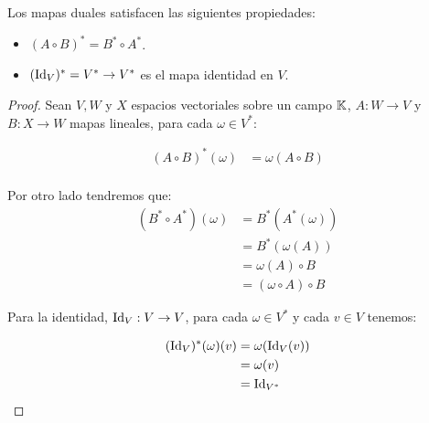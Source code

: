 \begin{lemma}
Los mapas duales satisfacen las siguientes propiedades:
  \begin{itemize}
    \item $(A \circ B)^{*} = B^{*} \circ A^{*}$.
    \item $(\mathrm{Id}_V)^{*} = V^{*} \to V^{*}$ es el mapa identidad en $V$.
  \end{itemize}
\end{lemma}

\begin{proof}
  Sean $V,W$ y $X$ espacios vectoriales sobre un campo $\mathbb{K}$, $A: W \to V$ y $B: X \to W$ mapas lineales, para cada $\omega \in V^{*}$:
  
\begin{align*}
  (A\circ B)^{*}(\omega) &= \omega(A \circ B)\\
\end{align*}

Por otro lado tendremos que:
  \begin{align*}
    (B^* \circ A^*)(\omega) &= B^{*}(A^*(\omega)) \\
    &= B^{*}(\omega(A)) \\
    &= \omega(A) \circ B\\
    &= (\omega \circ A) \circ B
  \end{align*}

  Para la identidad, $\mathrm{Id}_V: V \to V$, para cada $\omega \in V^{*}$ y cada $v \in V$ tenemos:

  \begin{align*}
    (\mathrm{Id}_V)^{*}(\omega)(v) &= \omega(\mathrm{Id}_V(v))\\
    &= \omega(v)\\
    &= \mathrm{Id}_{V^{*}}
  \end{align*}
\end{proof}

